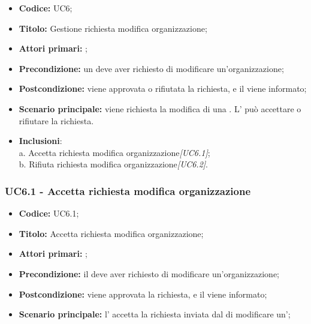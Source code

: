 \documentclass[casi-duso]{subfiles}
\begin{document}
\begin{itemize}
  \item \textbf{Codice:} UC6;
  \item \textbf{Titolo:} Gestione richiesta modifica organizzazione;
  \item \textbf{Attori primari:} ;
  \item \textbf{Precondizione:} un  deve aver richiesto di modificare un'organizzazione;
  \item \textbf{Postcondizione:} viene approvata o rifiutata la richiesta, e il  viene informato;
  \item \textbf{Scenario principale:} viene richiesta la modifica di una . L' può accettare o rifiutare la richiesta.
  \item \textbf{Inclusioni}:
        \\a. Accetta richiesta modifica organizzazione\emph{[UC6.1]};
        \\b. Rifiuta richiesta modifica organizzazione\emph{[UC6.2]}.
\end{itemize}


\subsubsection{UC6.1 - Accetta richiesta modifica organizzazione}
\label{subsub:UC6.1}
\begin{itemize}
  \item \textbf{Codice:} UC6.1;
  \item \textbf{Titolo:} Accetta richiesta modifica organizzazione;
  \item \textbf{Attori primari:} ;
  \item \textbf{Precondizione:} il  deve aver richiesto di modificare un'organizzazione;
  \item \textbf{Postcondizione:} viene approvata la richiesta, e il  viene informato;
  \item \textbf{Scenario principale:} l' accetta la richiesta inviata dal  di modificare
  un';
\end{itemize}
\end{document}
